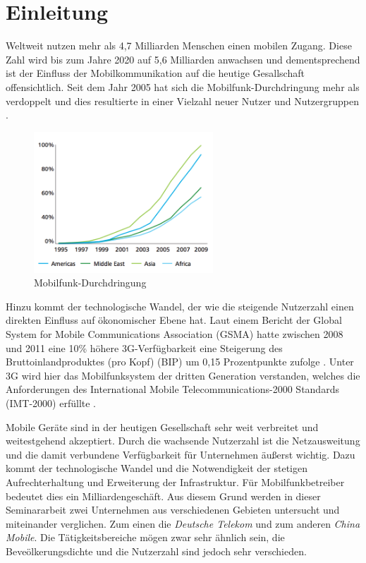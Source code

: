 \section{Einleitung}

Weltweit nutzen mehr als 4,7 Milliarden Menschen einen mobilen Zugang. Diese Zahl wird bis zum Jahre 2020 auf 5,6 Milliarden anwachsen \cite{gsma2016} und dementsprechend ist der Einfluss der Mobilkommunikation auf die heutige Gesallschaft offensichtlich. Seit dem Jahr 2005 hat sich die Mobilfunk-Durchdringung mehr als verdoppelt und dies resultierte in einer Vielzahl neuer Nutzer und Nutzergruppen \cite{gsma2012}.

\begin{figure}[H]
\centering
\includegraphics[width=0.6\textwidth]{pictures/mobpen.png}
\caption{Mobilfunk-Durchdringung \cite{gsma2012}}
\label{fig:mobpen}
\end{figure}

Hinzu kommt der technologische Wandel, der wie die steigende Nutzerzahl einen direkten Einfluss auf ökonomischer Ebene hat. Laut einem Bericht der Global System for Mobile Communications Association (GSMA) hatte zwischen 2008 und 2011 eine 10\% höhere 3G-Verfügbarkeit eine Steigerung des Bruttoinlandproduktes (pro Kopf) (BIP) um 0,15 Prozentpunkte zufolge \cite{gsma2012}. Unter 3G wird hier das Mobilfunksystem der dritten Generation verstanden, welches die Anforderungen des International Mobile Telecommunications-2000 Standards (IMT-2000) erfüllte \cite{schiller2003mobile}.   

Mobile Geräte sind in der heutigen Gesellschaft sehr weit verbreitet und weitestgehend akzeptiert. Durch die wachsende Nutzerzahl ist die Netzausweitung und die damit verbundene Verfügbarkeit für Unternehmen äußerst wichtig. Dazu kommt der technologische Wandel und die Notwendigkeit der stetigen Aufrechterhaltung und Erweiterung der Infrastruktur. Für Mobilfunkbetreiber bedeutet dies ein Milliardengeschäft. Aus diesem Grund werden in dieser Seminararbeit zwei Unternehmen aus verschiedenen Gebieten untersucht und miteinander verglichen. Zum einen die \textit{Deutsche Telekom} und zum anderen \textit{China Mobile}. Die Tätigkeitsbereiche mögen zwar sehr ähnlich sein, die Beveölkerungsdichte und die Nutzerzahl sind jedoch sehr verschieden. 

